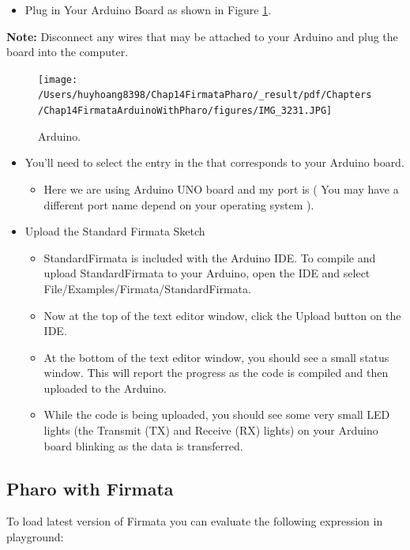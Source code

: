 \documentclass[10pt,twoside,english]{_support/latex/sbabook/sbabook}
\begin{document}
\begin{itemize}
\item Plug in Your Arduino Board as shown in Figure \ref{ArduinoConnection}.
\end{itemize}

\textbf{Note:} Disconnect any wires that may be attached to your Arduino and plug the board into the computer.

\begin{figure}

\begin{center}
\texttt{[image: /Users/huyhoang8398/Chap14FirmataPharo/\_result/pdf/Chapters/Chap14FirmataArduinoWithPharo/figures/IMG\_3231.JPG]}\caption{Arduino.\label{ArduinoConnection}}\end{center}
\end{figure}


\begin{itemize}
\item You'll need to select the entry in the  that corresponds to your Arduino board. 
\begin{itemize}
\item Here we are using Arduino UNO board and my port is  ( You may have a different port name depend on your operating system ).
\end{itemize}

\item Upload the Standard Firmata Sketch
\begin{itemize}
\item StandardFirmata is included with the Arduino IDE. To compile and upload StandardFirmata to your Arduino, open the IDE and select File/Examples/Firmata/StandardFirmata. 
\item Now at the top of the text editor window, click the Upload button on the IDE.
\item At the bottom of the text editor window, you should see a small status window. This will report the progress as the code is compiled and then uploaded to the Arduino. 
\item While the code is being uploaded, you should see some very small LED lights (the Transmit (TX) and Receive (RX) lights) on your Arduino board blinking as the data is transferred.
\end{itemize}

\end{itemize}
\subsection{Pharo with Firmata}
To load latest version of Firmata you can evaluate the following expression in playground:
\end{document}
